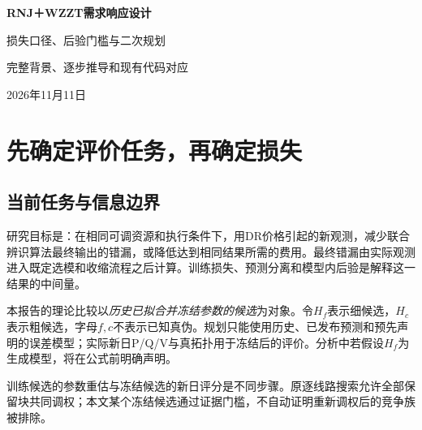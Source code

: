 \documentclass[UTF8,11pt,a4paper,fontset=fandol]{ctexart}
\numberwithin{equation}{section}
\begin{document}
\begin{center}
{\LARGE\bfseries RNJ＋WZZT需求响应设计}\par\vspace{5pt}
{\Large 损失口径、后验门槛与二次规划}\par\vspace{5pt}
{\large 完整背景、逐步推导和现有代码对应}\par\vspace{5pt}
2026年11月11日
\end{center}

\begin{abstract}
本文解决一个具体问题：怎样选择拓扑辨识与需求响应（DR）设计的损失，使统计解释、算法接受和最终评价具有清楚的关系。建议保留现有RNJ＋WZZT联合流程的平均绝对误差作为主评价；将Gaussian平方残差设计列为另一个明确命名的统计版本。固定协方差的Gaussian后验对应加性平方残差差，不能直接等价当前相对MAE门槛。若共同噪声尺度未知，对尺度积分可导出带正偏移的相对残差条件；Gaussian版本保留二次结构，Laplace版本与原MAE同源。文中分别推导两者，说明协方差、共同误差、历史计数和概率要求如何处理。所有未知尺度结果属于本次理论推导；现有实现仍采用固定对角Gaussian似然。本文不改变代码或开展新的辨识实验。
\end{abstract}
\tableofcontents
\newpage

\section{先确定评价任务，再确定损失}
\label{sec:choice}
\subsection{当前任务与信息边界}
研究目标是：在相同可调资源和执行条件下，用DR价格引起的新观测，减少联合辨识算法最终输出的错漏，或降低达到相同结果所需的费用。最终错漏由实际观测进入既定选模和收缩流程之后计算。训练损失、预测分离和模型内后验是解释这一结果的中间量。

本报告的理论比较以\emph{历史已拟合并冻结参数的候选}为对象。令$H_f$表示细候选，$H_c$表示粗候选，字母$f,c$不表示已知真伪。规划只能使用历史、已发布预测和预先声明的误差模型；实际新日P/Q/V与真拓扑用于冻结后的评价。分析中若假设$H_f$为生成模型，将在公式前明确声明。

训练候选的参数重估与冻结候选的新日评分是不同步骤。原逐线路搜索允许全部保留块共同调权；本文某个冻结候选通过证据门槛，不自动证明重新调权后的竞争族被排除。
\end{document}
